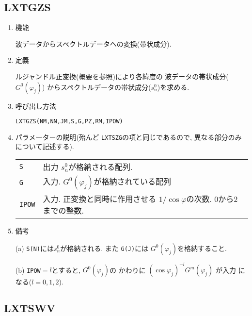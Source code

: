 \documentclass[a4j]{jarticle}
\begin{document}

\subsection{LXTGZS}

\begin{enumerate}

\item 機能 

波データからスペクトルデータへの変換(帯状成分).


\item 定義

ルジャンドル正変換(概要を参照)により各緯度の
波データの帯状成分($G^0(\varphi_j)$)
からスペクトルデータの帯状成分($s^0_n$)を求める.

\item 呼び出し方法 

\texttt{LXTGZS(NM,NN,JM,S,G,PZ,RM,IPOW)}
  
\item パラメーターの説明(殆んど \texttt{LXTSZG}の項と同じであるので,
異なる部分のみについて記述する).

\begin{tabular}{ll}
\texttt{S} & 出力 $s^0_n$が格納される配列.\\
\texttt{G} & 入力. $G^0(\varphi_j)$が格納されている配列\\
\texttt{IPOW} & 入力. 正変換と同時に作用させる
                      $1/\cos\varphi$の次数. 0から2までの整数.
\end{tabular}

\item 備考

(a) \texttt{S(N)}には$s^0_n$が格納される. また
\texttt{G(J)}には  $G^0(\varphi_j)$を格納すること.

(b) \texttt{IPOW}$=l$とすると, $G^0(\varphi_j)$の
    かわりに $(\cos\varphi_j)^{-l}G^m(\varphi_j)$ が入力
    になる($l=0,1,2$). 
   
\end{enumerate}


\subsection{LXTSWV}
\end{document}
